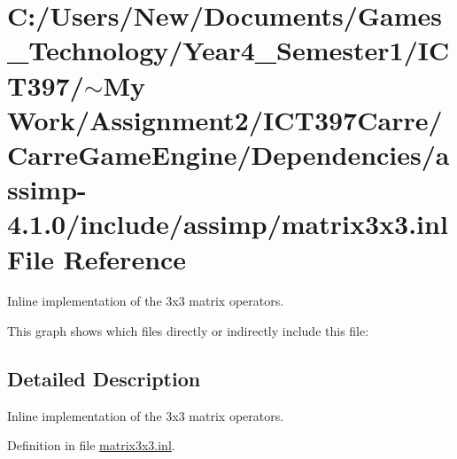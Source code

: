 \hypertarget{matrix3x3_8inl}{
\section{C:/Users/New/Documents/Games\_\-Technology/Year4\_\-Semester1/ICT397/$\sim$My Work/Assignment2/ICT397Carre/CarreGameEngine/Dependencies/assimp-4.1.0/include/assimp/matrix3x3.inl File Reference}
\label{matrix3x3_8inl}
}
Inline implementation of the 3x3 matrix operators. 



This graph shows which files directly or indirectly include this file:

\subsection{Detailed Description}
Inline implementation of the 3x3 matrix operators. 



Definition in file \hyperlink{matrix3x3_8inl-source}{matrix3x3.inl}.